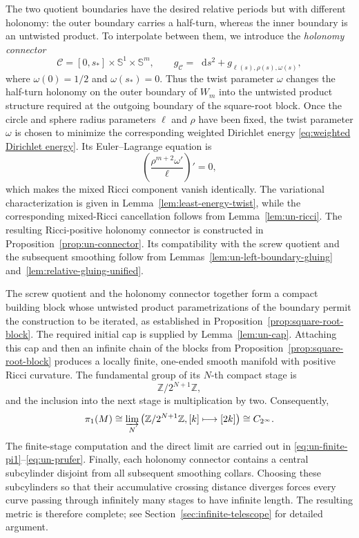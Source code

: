 \documentclass[11pt,reqno]{amsart}
\theoremstyle{definition}
\numberwithin{equation}{section}
\newcommand{\dd}{\mathop{}\!\mathrm d}
\newcommand{\CPrufer}{C_{2^\infty}}
\begin{document}
The two quotient boundaries have the desired relative periods but
with different holonomy: the outer boundary carries a half-turn, whereas
the inner boundary is an untwisted product.  To interpolate between
them, we introduce the \emph{holonomy connector}
\begin{equation}\label{def:holonomy-connector}
 \mathcal C=[0,s_*]\times\mathbb S^1\times\mathbb S^m,
 \qquad
 g_{\mathcal C}=\dd s^2+g_{\ell(s),\rho(s),\omega(s)},
\end{equation}
where $\omega(0)=1/2$ and $\omega(s_*)=0$.  Thus the twist parameter $\omega$ changes
the half-turn holonomy on the outer boundary of $W_m$ into the untwisted
product structure required at the outgoing boundary of the square-root
block.  Once the circle and sphere radius parameters $\ell$ and $\rho$
have been fixed, the twist parameter $\omega$ is chosen to minimize the
corresponding weighted Dirichlet energy \eqref{eq:weighted Dirichlet energy}.  Its Euler--Lagrange equation
is
\[
 \left(
   \frac{\rho^{m+2}\omega'}{\ell}
 \right)'=0,
\]
which makes the mixed Ricci component vanish identically. The variational characterization is given in Lemma~\ref{lem:least-energy-twist}, while the corresponding
mixed-Ricci cancellation follows from Lemma~\ref{lem:un-ricci}. The resulting Ricci-positive holonomy connector is constructed in
Proposition~\ref{prop:un-connector}.  Its compatibility with the screw
quotient and the subsequent smoothing follow from
Lemmas~\ref{lem:un-left-boundary-gluing}
and~\ref{lem:relative-gluing-unified}.

The screw quotient and the holonomy connector together form a compact building block whose untwisted product parametrizations of the boundary permit the
construction to be iterated, as established in
Proposition~\ref{prop:square-root-block}.  The required initial cap is
supplied by Lemma~\ref{lem:un-cap}.  Attaching this cap and then an
infinite chain of the blocks from
Proposition~\ref{prop:square-root-block} produces a locally finite,
one-ended smooth manifold with positive Ricci curvature. The
fundamental group of its $N$-th compact stage is
\[
 \mathbb Z/2^{N+1}\mathbb Z,
\]
and the inclusion into the next stage is multiplication by two.
Consequently,
\[
 \pi_1(M)
 \cong
 \varinjlim_N
 \left(
   \mathbb Z/2^{N+1}\mathbb Z,
   [k]\longmapsto[2k]
 \right)
 \cong
 \CPrufer.
\]
The finite-stage computation and the direct limit are
carried out in
\eqref{eq:un-finite-pi1}--\eqref{eq:un-prufer}.
Finally, each holonomy connector contains a central subcylinder disjoint
from all subsequent smoothing collars.  Choosing these subcylinders so
that their accumulative
crossing distance diverges forces every curve passing through
infinitely many stages to have infinite length. The resulting metric is therefore complete; see Section~\ref{sec:infinite-telescope} for detailed argument.
\end{document}
